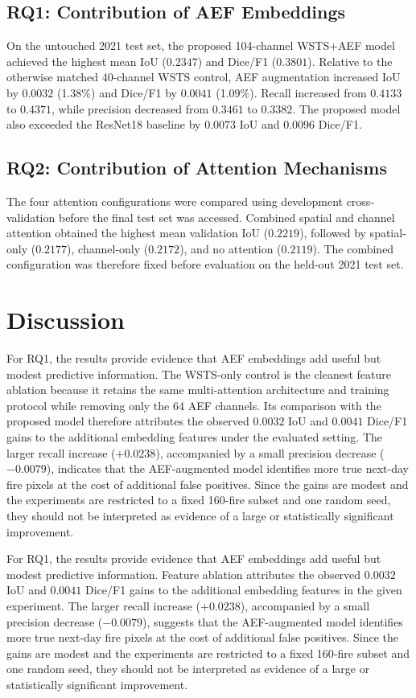 \documentclass[sigconf]{acmart}
\begin{document}
\subsection{RQ1: Contribution of AEF Embeddings}
On the untouched 2021 test set, the proposed 104-channel WSTS+AEF model achieved the highest mean
IoU ($0.2347$) and Dice/F1 ($0.3801$). Relative to the otherwise matched 40-channel WSTS control,
AEF augmentation increased IoU by $0.0032$ (1.38\%) and Dice/F1 by $0.0041$ (1.09\%).
Recall increased from $0.4133$ to $0.4371$, while precision decreased from $0.3461$ to $0.3382$.
The proposed model also exceeded the ResNet18 baseline by $0.0073$ IoU and $0.0096$ Dice/F1.

\subsection{RQ2: Contribution of Attention Mechanisms}
The four attention configurations were compared using development cross-validation before the final
test set was accessed. Combined spatial and channel attention obtained the highest mean validation IoU
($0.2219$), followed by spatial-only ($0.2177$), channel-only ($0.2172$), and no attention ($0.2119$).
The combined configuration was therefore fixed before evaluation on the held-out 2021 test set.

\section{Discussion}
{\color{red}For RQ1, the results provide evidence that AEF embeddings add useful but modest predictive information.
 The WSTS-only control is the cleanest feature ablation because it retains the same multi-attention
architecture and training protocol while removing only the 64 AEF channels. Its comparison with the
proposed model therefore attributes the observed $0.0032$ IoU and $0.0041$ Dice/F1 gains to the
additional embedding features under the evaluated setting. The larger recall increase ($+0.0238$),
accompanied by a small precision decrease ($-0.0079$), indicates that the AEF-augmented model identifies
more true next-day fire pixels at the cost of additional false positives. Since the gains are modest and
the experiments are restricted to a fixed 160-fire subset and one random seed, they should not be
interpreted as evidence of a large or statistically significant improvement.}

{\color{green} For RQ1, the results provide evidence that AEF embeddings add useful but modest predictive information.
Feature ablation attributes the observed $0.0032$ IoU and $0.0041$ Dice/F1 gains to the
additional embedding features in the given experiment. The larger recall increase ($+0.0238$),
accompanied by a small precision decrease ($-0.0079$), suggests that the AEF-augmented model identifies
more true next-day fire pixels at the cost of additional false positives. Since the gains are modest and
the experiments are restricted to a fixed 160-fire subset and one random seed, they should not be
interpreted as evidence of a large or statistically significant improvement.}
\end{document}
